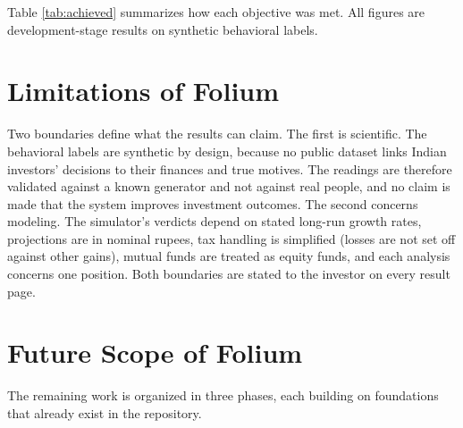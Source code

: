 Table \ref{tab:achieved} summarizes how each objective was met. All figures are development-stage results on synthetic behavioral labels.

\section{Limitations of Folium}
\label{sec:boundaries}
Two boundaries define what the results can claim. The first is scientific. The behavioral labels are synthetic by design, because no public dataset links Indian investors' decisions to their finances and true motives. The readings are therefore validated against a known generator and not against real people, and no claim is made that the system improves investment outcomes. The second concerns modeling. The simulator's verdicts depend on stated long-run growth rates, projections are in nominal rupees, tax handling is simplified (losses are not set off against other gains), mutual funds are treated as equity funds, and each analysis concerns one position. Both boundaries are stated to the investor on every result page.

\section{Future Scope of Folium}
The remaining work is organized in three phases, each building on foundations that already exist in the repository.


